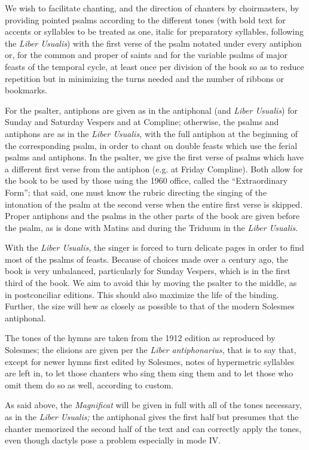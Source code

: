 \begin{enpars}
We wish to facilitate chanting, and the direction of chanters by choirmasters, by providing pointed psalms according to the different tones (with bold text for accents or syllables to be treated as one, italic for preparatory syllables, following the \textit{Liber Usualis}) with the first verse of the psalm notated under every antiphon or, for the common and proper of saints and for the variable psalms of major feasts of the temporal cycle, at least once per division of the book so as to reduce repetition but in minimizing the turns needed and the number of ribbons or bookmarks.

For the psalter, antiphons are given as in the antiphonal (and \textit{Liber Usualis}) for Sunday and Saturday Vespers and at Compline; otherwise, the psalms and antiphons are as in the \textit{Liber Usualis,} with the full antiphon at the beginning of the corresponding psalm, in order to chant on double feasts which use the ferial psalms and antiphons. In the psalter, we give the first verse of psalms which have a different first verse from the antiphon (e.g. at Friday Compline). Both allow for the book to be used by those using the 1960 office, called the ``Extraordinary Form''; that said, one must know the rubric directing the singing of the intonation of the psalm at the second verse when the entire first verse is skipped. Proper antiphons and the psalms in the other parts of the book are given before the psalm, as is done with Matins and during the Triduum in the \textit{Liber Usualis}.

With the \textit{Liber Usualis,} the singer is forced to turn delicate pages in order to find most of the psalms of feasts. Because of choices made over a century ago, the book is very unbalanced, particularly for Sunday Vespers, which is in the first third of the book. We aim to avoid this by moving the psalter to the middle, as in postconciliar editions. This should also maximize the life of the binding. Further, the size will hew as closely as possible to that of the modern Solesmes antiphonal.

The tones of the hymns are taken from the 1912 edition as reproduced by Solesmes; the elisions are given per the \textit{Liber antiphonarius,} that is to say that, except for newer hymns first edited by Solesmes, notes of hypermetric syllables are left in, to let those chanters who sing them sing them and to let those who omit them do so as well, according to custom.

As said above, the \textit{Magnificat} will be given in full with all of the tones necessary, as in the \textit{Liber Usualis;} the antiphonal gives the first half but presumes that the chanter memorized the second half of the text and can correctly apply the tones, even though dactyls pose a problem especially in mode IV.


\end{enpars}
